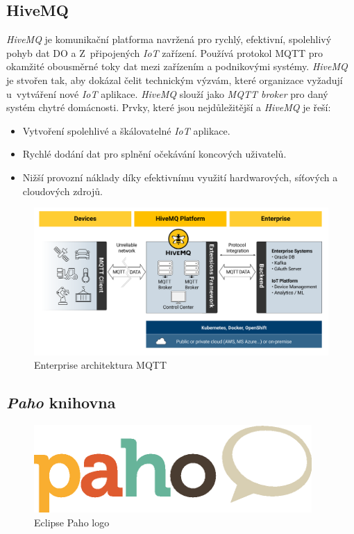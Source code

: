 \newpage
\subsection*{HiveMQ}
\label{pouzite:hivemq}

\emph{HiveMQ} je komunikační platforma navržená pro rychlý, efektivní, spolehlivý pohyb dat DO a Z~připojených \emph{IoT} zařízení.
Používá protokol MQTT pro okamžité obousměrné toky dat mezi zařízením a podnikovými systémy.
\emph{HiveMQ} je stvořen tak, aby dokázal čelit technickým výzvám, které organizace vyžadují u~vytváření nové \emph{IoT} aplikace.
\emph{HiveMQ} slouží jako \emph{MQTT broker} pro daný systém chytré domácnosti.
\newline
Prvky, které jsou nejdůležitější a \emph{HiveMQ} je řeší:
\begin{itemize}
  \item Vytvoření spolehlivé a škálovatelné \emph{IoT} aplikace.
  \item Rychlé dodání dat pro splnění očekávání koncových uživatelů.
  \item Nižší provozní náklady díky efektivnímu využití hardwarových, síťových a cloudových zdrojů.~\cite{hivemq:info}
\end{itemize}

\begin{figure}[hbt]
  \centering
  \includegraphics[width=1 \linewidth]{obrazky-figures/hivemq_arch.png}
  \caption{Enterprise architektura MQTT}
  \label{figure:hivemq_flow}
\end{figure}

\subsection*{\emph{Paho} knihovna}
\label{pouzite:paho}
\begin{figure}[hbt]
  \centering
  \includegraphics[width=.2 \linewidth]{obrazky-figures/paho.png}
  \caption{Eclipse Paho logo}
  \label{figure:paho}
\end{figure}

